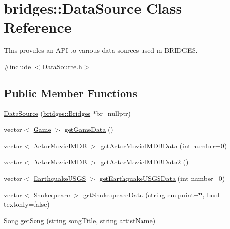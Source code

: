 \hypertarget{classbridges_1_1_data_source}{}\section{bridges\+:\+:Data\+Source Class Reference}
\label{classbridges_1_1_data_source}


This provides an A\+PI to various data sources used in B\+R\+I\+D\+G\+ES.  




{\ttfamily \#include $<$Data\+Source.\+h$>$}

\subsection*{Public Member Functions}
\begin{DoxyCompactItemize}
\item 
\mbox{\hyperlink{classbridges_1_1_data_source_afc95b52d2ca03a92c1f1ee1594a097c7}{Data\+Source}} (\mbox{\hyperlink{classbridges_1_1_bridges}{bridges\+::\+Bridges}} $\ast$br=nullptr)
\item 
vector$<$ \mbox{\hyperlink{classbridges_1_1_game}{Game}} $>$ \mbox{\hyperlink{classbridges_1_1_data_source_aa902e1dffd4169e2f6e6820299b8cde1}{get\+Game\+Data}} ()
\item 
vector$<$ \mbox{\hyperlink{classbridges_1_1_actor_movie_i_m_d_b}{Actor\+Movie\+I\+M\+DB}} $>$ \mbox{\hyperlink{classbridges_1_1_data_source_a664694136550312ab3f5a82bebb91bca}{get\+Actor\+Movie\+I\+M\+D\+B\+Data}} (int number=0)
\item 
vector$<$ \mbox{\hyperlink{classbridges_1_1_actor_movie_i_m_d_b}{Actor\+Movie\+I\+M\+DB}} $>$ \mbox{\hyperlink{classbridges_1_1_data_source_a00f0a0a1871d4864c6ccdd04195e0fb2}{get\+Actor\+Movie\+I\+M\+D\+B\+Data2}} ()
\item 
vector$<$ \mbox{\hyperlink{classbridges_1_1_earthquake_u_s_g_s}{Earthquake\+U\+S\+GS}} $>$ \mbox{\hyperlink{classbridges_1_1_data_source_a6645e2029915550fcac5f9fed7870119}{get\+Earthquake\+U\+S\+G\+S\+Data}} (int number=0)
\item 
vector$<$ \mbox{\hyperlink{classbridges_1_1_shakespeare}{Shakespeare}} $>$ \mbox{\hyperlink{classbridges_1_1_data_source_a7502065879fed9a952ba1cf0c0c74185}{get\+Shakespeare\+Data}} (string endpoint=\char`\"{}\char`\"{}, bool textonly=false)
\item 
\mbox{\hyperlink{classbridges_1_1_song}{Song}} \mbox{\hyperlink{classbridges_1_1_data_source_a284c9d572415b67df6989ab8ab97d0e2}{get\+Song}} (string song\+Title, string artist\+Name)

\end{DoxyCompactItemize}
